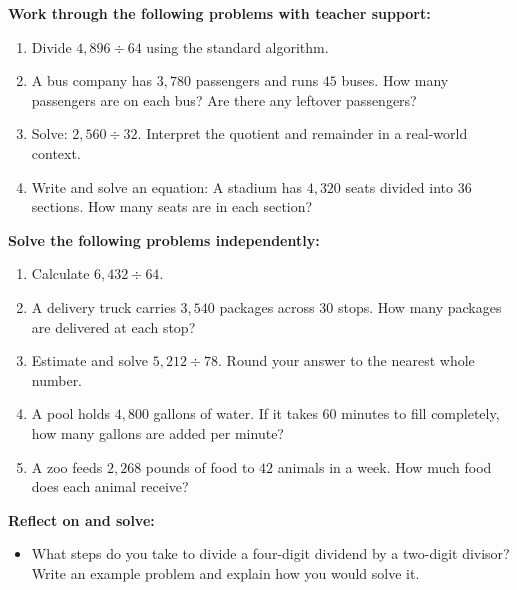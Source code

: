 \documentclass[12pt]{article}
\begin{document}
\vspace{1em}

\begin{tcolorbox}[colframe=black!60, colback=white, 
coltitle=black, colbacktitle=black!15, fonttitle=\bfseries\Large, 
title=Guided Practice, halign title=center, left=10pt, right=10pt, top=10pt, bottom=15pt]
\textbf{Work through the following problems with teacher support:}
\begin{enumerate}[itemsep=3em]
    \item Divide \( 4,896 \div 64 \) using the standard algorithm.
    \item A bus company has \( 3,780 \) passengers and runs \( 45 \) buses. How many passengers are on each bus? Are there any leftover passengers?
    \item Solve: \( 2,560 \div 32 \). Interpret the quotient and remainder in a real-world context.
    \item Write and solve an equation: A stadium has \( 4,320 \) seats divided into \( 36 \) sections. How many seats are in each section?
\end{enumerate}
\end{tcolorbox}

\vspace{1em}

\begin{tcolorbox}[colframe=black!60, colback=white, 
coltitle=black, colbacktitle=black!15, fonttitle=\bfseries\Large, 
title=Independent Practice, halign title=center, left=10pt, right=10pt, top=10pt, bottom=15pt]
\textbf{Solve the following problems independently:}
\begin{enumerate}[itemsep=3em]
    \item Calculate \( 6,432 \div 64 \).
    \item A delivery truck carries \( 3,540 \) packages across \( 30 \) stops. How many packages are delivered at each stop?
    \item Estimate and solve \( 5,212 \div 78 \). Round your answer to the nearest whole number.
    \item A pool holds \( 4,800 \) gallons of water. If it takes \( 60 \) minutes to fill completely, how many gallons are added per minute?
    \item A zoo feeds \( 2,268 \) pounds of food to \( 42 \) animals in a week. How much food does each animal receive?
\end{enumerate}
\end{tcolorbox}

\vspace{1em}

\begin{tcolorbox}[colframe=black!60, colback=white, 
coltitle=black, colbacktitle=black!15, fonttitle=\bfseries\Large, 
title=Exit Ticket, halign title=center, left=10pt, right=10pt, top=10pt, bottom=15pt]
\textbf{Reflect on and solve:}
\begin{itemize}
    \item What steps do you take to divide a four-digit dividend by a two-digit divisor? Write an example problem and explain how you would solve it.
\end{itemize}
\end{tcolorbox}
\end{document}
